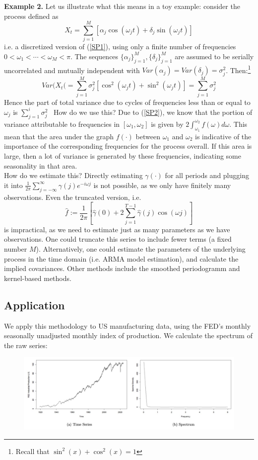 \bigskip
\textbf{Example 2.} Let us illustrate what this means in a toy example: consider the process defined as \[
X_t=\sum_{j=1}^M [\alpha_j \cos(\omega_j t) + \delta_j \sin(\omega_j t)]
\] i.e. a discretized version of (\ref{SP1}), using only a finite number of frequencies $0<\omega_1<\cdots<\omega_M<\pi$. The sequences $\{\alpha_j\}_{j=1}^M, \{\delta_j\}_{j=1}^M$ are assumed to be serially uncorrelated and mutually independent with $Var(\alpha_j)=Var(\delta_j)=\sigma_j^2$. Then:\footnote{Recall that $\sin^2(x)+\cos^2(x)=1$} \[
Var(X_t(=\sum_{j=1}^M \sigma_j^2 [\cos^2(\omega_j t)+ \sin^2 (\omega_j t)]=\sum_{j=1}^M \sigma_j^2
\] Hence the part of total variance due to cycles of frequencies less than or equal to $\omega_j$ is $\sum_{j=1}^i \sigma_j^2$ \
How do we use this? Due to (\ref{SP2}), we know that the portion of variance attributable to frequencies in $[\omega_1, \omega_2]$ is given by $2\int_{\omega_1}^{\omega_2}f(\omega)d\omega $. This mean that the area under the graph $f(\cdot)$ between $\omega_1$ and $\omega_2$ is indicative of the importance of the corresponding frequencies for the process overall. If this area is large, then a lot of variance is generated by these frequencies, indicating some seasonality in that area.\\

How do we estimate this? Directly estimating $\gamma(\cdot)$ for all periods and plugging it into $\frac{1}{2\pi}\sum_{j=-\infty}^\infty \gamma(j)e^{-i\omega j} $ is not possible, as we only have finitely many observations. Even the truncated version, i.e. \[ 
\hat{f}:=\frac{1}{2\pi}[ \hat{\gamma}(0)+2\sum_{j=1}^{T-1} \hat{\gamma}(j)\cos(\omega j) ]
\] is impractical, as we need to estimate just as many parameters as we have observations. One could truncate this series to include fewer terms (a fixed number $M$). Alternatively, one could estimate the parameters of the underlying process in the time domain (i.e. ARMA model estimation), and calculate the implied covariances. Other methods include the smoothed periodogramm and kernel-based methods.

\subsection{Application}

We apply this methodology to US manufacturing data, using the FED's monthly seasonally unadjusted monthly index of production. We calculate the spectrum of the raw series: 

\begin{figure}[H]
\includegraphics[scale=0.4]{images/Screenshot 2024-05-06 at 10.37.34.jpg}
\centering
\end{figure}

